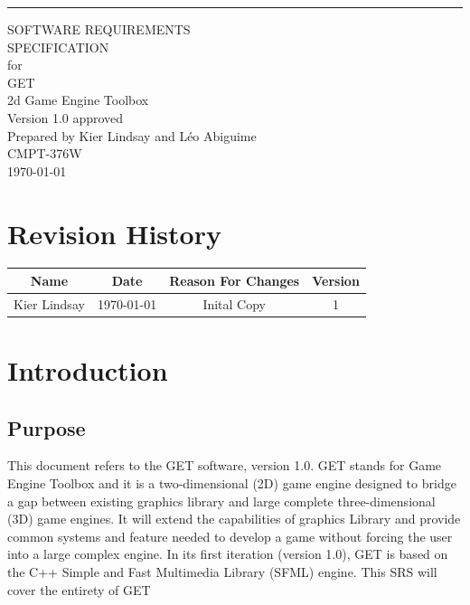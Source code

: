 \documentclass{scrreprt}
\date{}
\def\myversion{1.0 }
\begin{document}
\begin{flushright}
    \rule{16cm}{5pt}\vskip1cm
    \begin{bfseries}
        \Huge{SOFTWARE REQUIREMENTS\\ SPECIFICATION}\\
        \vspace{1.9cm}
        for\\
        \vspace{1.9cm}
        GET\\
        2d Game Engine Toolbox\\
        \vspace{1.9cm}
        \LARGE{Version \myversion approved}\\
        \vspace{1.9cm}
        Prepared by Kier Lindsay and Léo Abiguime\\
        \vspace{1.9cm}
        CMPT-376W\\
        \vspace{1.9cm}
        \today\\
    \end{bfseries}
\end{flushright}

\tableofcontents


\chapter*{Revision History}

\begin{center}
    \begin{tabular}{|c|c|c|c|}
        \hline
	    Name & Date & Reason For Changes & Version\\
        \hline
	    Kier Lindsay & \today & Inital Copy & 1\\
        \hline
    \end{tabular}
\end{center}

\chapter{Introduction}

\section{Purpose}
This document refers to the GET software, version 1.0. GET stands for Game Engine Toolbox and it is a two-dimensional (2D) game engine designed to bridge a gap between existing graphics library and large complete three-dimensional (3D) game engines.  It will extend the capabilities of graphics Library and provide common systems and feature needed to develop a game without forcing the user into a large complex engine. In its first iteration (version 1.0), GET is based on the C++ Simple and Fast Multimedia Library (SFML) engine. This SRS will cover the entirety of GET
\end{document}
